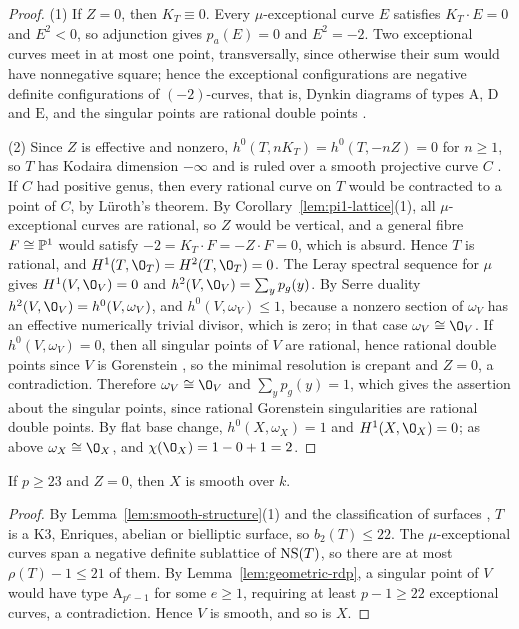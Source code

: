 \begin{proof}
(1) If $Z = 0$, then $K_T\equiv 0$.
Every $\mu$-exceptional curve $E$ satisfies $K_T\cdot E = 0$ and $E^2<0$, so adjunction gives $p_a(E) = 0$ and $E^2 = -2$.
Two exceptional curves meet in at most one point, transversally, since otherwise their sum would have nonnegative square; hence the exceptional configurations are negative definite configurations of $(-2)$-curves, that is, Dynkin diagrams of types $\mathrm A$, $\mathrm D$ and $\mathrm E$, and the singular points are rational double points \cite{Art77}.

(2) Since $Z$ is effective and nonzero, $h^0(T,nK_T) = h^0(T,-nZ) = 0$ for $n\geq 1$, so $T$ has Kodaira dimension $-\infty$ and is ruled over a smooth projective curve $C$ \cite{Mum69}.
If $C$ had positive genus, then every rational curve on $T$ would be contracted to a point of $C$, by L\"uroth's theorem.
By Corollary~\ref{lem:pi1-lattice}(1), all $\mu$-exceptional curves are rational, so $Z$ would be vertical, and a general fibre $F\cong\mathbb{P}^1$ would satisfy $-2 = K_T\cdot F = -Z\cdot F = 0$, which is absurd.
Hence $T$ is rational, and $H^1(T,\O_T) = H^2(T,\O_T) = 0$.
The Leray spectral sequence for $\mu$ gives $H^1(V,\O_V) = 0$ and $h^2(V,\O_V) = \sum_yp_g(y)$.
By Serre duality $h^2(V,\O_V) = h^0(V,\omega_V)$, and $h^0(V,\omega_V)\leq 1$, because a nonzero section of $\omega_V$ has an effective numerically trivial divisor, which is zero; in that case $\omega_V\cong\O_V$.
If $h^0(V,\omega_V) = 0$, then all singular points of $V$ are rational, hence rational double points since $V$ is Gorenstein \cite{Art77}, so the minimal resolution is crepant and $Z = 0$, a contradiction.
Therefore $\omega_V\cong\O_V$ and $\sum_yp_g(y) = 1$, which gives the assertion about the singular points, since rational Gorenstein singularities are rational double points.
By flat base change, $h^0(X,\omega_X) = 1$ and $H^1(X,\O_X) = 0$; as above $\omega_X\cong\O_X$, and $\chi(\O_X) = 1-0+1 = 2$.
\end{proof}

\begin{proposition}\label{prop:smooth-Z0}
If $p\geq 23$ and $Z = 0$, then $X$ is smooth over $k$.
\end{proposition}

\begin{proof}
By Lemma~\ref{lem:smooth-structure}(1) and the classification of surfaces \cite{BM77}, $T$ is a K3, Enriques, abelian or bielliptic surface, so $b_2(T)\leq 22$.
The $\mu$-exceptional curves span a negative definite sublattice of $\operatorname{NS}(T)$, so there are at most $\rho(T)-1\leq 21$ of them.
By Lemma~\ref{lem:geometric-rdp}, a singular point of $V$ would have type $\mathrm A_{p^e-1}$ for some $e\geq 1$, requiring at least $p-1\geq 22$ exceptional curves, a contradiction.
Hence $V$ is smooth, and so is $X$.
\end{proof}

